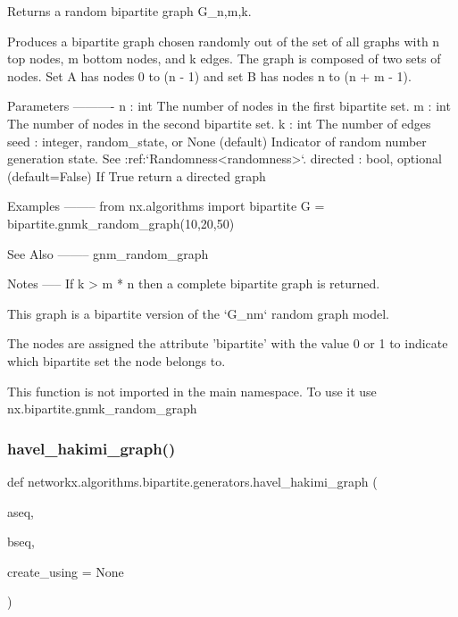 \begin{DoxyVerb}Returns a random bipartite graph G_{n,m,k}.

Produces a bipartite graph chosen randomly out of the set of all graphs
with n top nodes, m bottom nodes, and k edges.
The graph is composed of two sets of nodes.
Set A has nodes 0 to (n - 1) and set B has nodes n to (n + m - 1).

Parameters
----------
n : int
    The number of nodes in the first bipartite set.
m : int
    The number of nodes in the second bipartite set.
k : int
    The number of edges
seed : integer, random_state, or None (default)
    Indicator of random number generation state.
    See :ref:`Randomness<randomness>`.
directed : bool, optional (default=False)
    If True return a directed graph

Examples
--------
from nx.algorithms import bipartite
G = bipartite.gnmk_random_graph(10,20,50)

See Also
--------
gnm_random_graph

Notes
-----
If k > m * n then a complete bipartite graph is returned.

This graph is a bipartite version of the `G_{nm}` random graph model.

The nodes are assigned the attribute 'bipartite' with the value 0 or 1
to indicate which bipartite set the node belongs to.

This function is not imported in the main namespace.
To use it use nx.bipartite.gnmk_random_graph
\end{DoxyVerb}
 \mbox{\label{namespacenetworkx_1_1algorithms_1_1bipartite_1_1generators_a305160f75bfa76406ac65ca68f364300}} 
\subsubsection{\texorpdfstring{havel\+\_\+hakimi\+\_\+graph()}{havel\_hakimi\_graph()}}
{\footnotesize\ttfamily def networkx.\+algorithms.\+bipartite.\+generators.\+havel\+\_\+hakimi\+\_\+graph (\begin{DoxyParamCaption}\item[{}]{aseq,  }\item[{}]{bseq,  }\item[{}]{create\+\_\+using = {\ttfamily None} }\end{DoxyParamCaption})}

